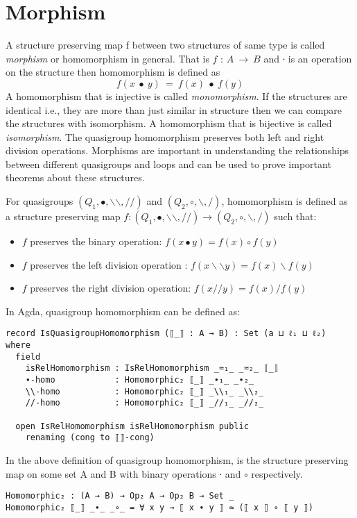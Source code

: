 \section{Morphism}
A structure preserving map f between two structures of same type is called
\textit{morphism} or homomorphism in general. That is \(f\) : \(A \ \rightarrow \
B\) and ∙ is an operation on the structure then homomorphism is defined as
\[f(x\  ∙ \  y) \ = \ f(x) \ ∙ \  f(y)\] A homomorphism that is injective is
called \textit{monomorphism}. If the structures are identical i.e., they are
more than just similar in structure then we can compare the structures with
isomorphism. A homomorphism that is bijective is called \textit{isomorphism}.
The quasigroup homomorphism preserves both left and right division
operations. Morphisms are important in understanding the relationships between
different quasigroups and loops and can be used to prove important theorems
about these structures.

For quasigroups $(Q_1,∙,\backslash \backslash ,//)$ and $(Q_2,\circ,\backslash ,/)$,
homomorphism is defined as a structure preserving map \( f:(Q_1,∙,\backslash
\backslash,//) \rightarrow (Q_2,\circ,\backslash,/) \) such that:
\begin{itemize}
  \item $f$ preserves the binary operation: $f(x∙y) = f(x) \circ f(y)$
  \item $f$ preserves the left division operation : $f(x\backslash \backslash y) = f(x)\backslash f(y)$
  \item $f$ preserves the right division operation: $f(x//y) = f(x)/f(y)$
\end{itemize}
In Agda, quasigroup homomorphism can be defined as:
\begin{verbatim}
record IsQuasigroupHomomorphism (⟦_⟧ : A → B) : Set (a ⊔ ℓ₁ ⊔ ℓ₂) where
  field
    isRelHomomorphism : IsRelHomomorphism _≈₁_ _≈₂_ ⟦_⟧
    ∙-homo            : Homomorphic₂ ⟦_⟧ _∙₁_ _∙₂_
    \\-homo           : Homomorphic₂ ⟦_⟧ _\\₁_ _\\₂_
    //-homo           : Homomorphic₂ ⟦_⟧ _//₁_ _//₂_

  open IsRelHomomorphism isRelHomomorphism public
    renaming (cong to ⟦⟧-cong)
\end{verbatim}
In the above definition of quasigroup homomorphism,  is the
structure preserving map on some set A and B with binary operations ∙ and
$\circ$ respectively.
\begin{verbatim}
Homomorphic₂ : (A → B) → Op₂ A → Op₂ B → Set _
Homomorphic₂ ⟦_⟧ _∙_ _∘_ = ∀ x y → ⟦ x ∙ y ⟧ ≈ (⟦ x ⟧ ∘ ⟦ y ⟧)
\end{verbatim}

